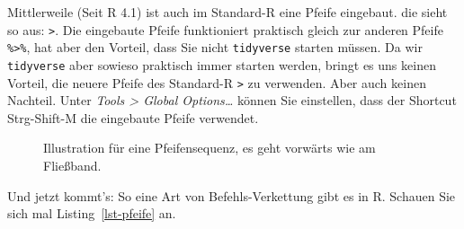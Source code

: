 \documentclass[
  a4paper,
]{scrbook}
\theoremstyle{definition}
\theoremstyle{definition}
\theoremstyle{definition}
\theoremstyle{remark}
\begin{document}

Mittlerweile (Seit R 4.1) ist auch im Standard-R eine Pfeife eingebaut.
die sieht so aus: \texttt{\textbar{}\textgreater{}}. Die eingebaute
Pfeife funktioniert praktisch gleich zur anderen Pfeife
\texttt{\%\textgreater{}\%}, hat aber den Vorteil, dass Sie nicht
\texttt{tidyverse} starten müssen. Da wir \texttt{tidyverse} aber
sowieso praktisch immer starten werden, bringt es uns keinen Vorteil,
die neuere Pfeife des Standard-R \texttt{\textbar{}\textgreater{}} zu
verwenden. Aber auch keinen Nachteil. Unter \emph{Tools \textgreater{}
Global Options\ldots{}} können Sie einstellen, dass der Shortcut
Strg-Shift-M die eingebaute Pfeife verwendet.

\begin{figure}


\caption{\label{fig-pfeife}Illustration für eine Pfeifensequenz, es geht
vorwärts wie am Fließband.}

\end{figure}%

Und jetzt kommt's: So eine Art von Befehls-Verkettung gibt es in R.
Schauen Sie sich mal Listing~\ref{lst-pfeife} an.
\end{document}
